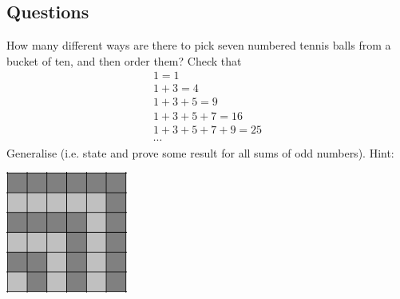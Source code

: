 \subsection*{Questions}
\begin{questions}
  \question How many different ways are there to pick seven numbered tennis balls from a bucket of ten, and then order them?
  \question Check that
            \begin{gather*}
              1 = 1\\
              1 + 3 = 4\\
              1 + 3 + 5 = 9\\
              1 + 3 + 5 + 7 = 16\\
              1 + 3 + 5 + 7 + 9 = 25\\
              \cdots
            \end{gather*}
            Generalise (i.e. state and prove some result for all sums of odd numbers). Hint:
            \begin{center}
              \includegraphics[width=0.3\textwidth]{sumodd}
            \end{center}
\end{questions}



